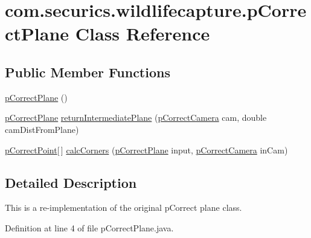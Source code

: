 \hypertarget{classcom_1_1securics_1_1wildlifecapture_1_1p_correct_plane}{\section{com.\+securics.\+wildlifecapture.\+p\+Correct\+Plane Class Reference}
\label{classcom_1_1securics_1_1wildlifecapture_1_1p_correct_plane}
}
\subsection*{Public Member Functions}
\begin{DoxyCompactItemize}
\item 
\hyperlink{classcom_1_1securics_1_1wildlifecapture_1_1p_correct_plane_afc9247db19d02fec531b460cf33fa667}{p\+Correct\+Plane} ()
\item 
\hyperlink{classcom_1_1securics_1_1wildlifecapture_1_1p_correct_plane}{p\+Correct\+Plane} \hyperlink{classcom_1_1securics_1_1wildlifecapture_1_1p_correct_plane_ae6141328b1b213f5be434fb8111bb4f0}{return\+Intermediate\+Plane} (\hyperlink{classcom_1_1securics_1_1wildlifecapture_1_1p_correct_camera}{p\+Correct\+Camera} cam, double cam\+Dist\+From\+Plane)
\item 
\hyperlink{classcom_1_1securics_1_1wildlifecapture_1_1p_correct_point}{p\+Correct\+Point}\mbox{[}$\,$\mbox{]} \hyperlink{classcom_1_1securics_1_1wildlifecapture_1_1p_correct_plane_ad6025bdf4a73113ebfee4a3db21a3d8f}{calc\+Corners} (\hyperlink{classcom_1_1securics_1_1wildlifecapture_1_1p_correct_plane}{p\+Correct\+Plane} input, \hyperlink{classcom_1_1securics_1_1wildlifecapture_1_1p_correct_camera}{p\+Correct\+Camera} in\+Cam)
\end{DoxyCompactItemize}


\subsection{Detailed Description}
This is a re-\/implementation of the original p\+Correct plane class. 

Definition at line 4 of file p\+Correct\+Plane.\+java.



